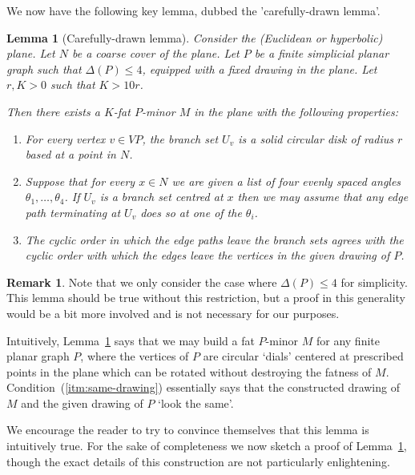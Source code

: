 \documentclass[10pt,a4paper]{amsart}
\newtheorem{lemma}[theorem]{Lemma}
\theoremstyle{definition}
\newtheorem{remark}[theorem]{Remark}
\begin{document}
We now have the following key lemma, dubbed the 'carefully-drawn lemma'. 

\begin{lemma}[Carefully-drawn lemma]\label{lem:dial}
     Consider the (Euclidean or hyperbolic) plane. Let $N$ be a coarse cover of the plane. Let $P$ be a finite simplicial planar graph such that $\Delta(P) \leq 4$, equipped with a fixed drawing in the plane. Let $r, K > 0$ such that $K > 10r$. 
     
     Then there exists a $K$-fat $P$-minor $M$ in the plane with the following properties:
     \begin{enumerate}

         \item\label{itm:disc-branchsets} For every vertex $v \in VP$, the branch set $U_v$ is a solid circular disk of radius $r$ based at a point in $N$. 

		\item Suppose that for every $x \in N$ we are given a list of four evenly spaced angles $\theta_1, \ldots, \theta_4$. If $U_v$ is a branch set centred at $x$ then we may assume that any edge path terminating at $U_v$ does so at one of the $\theta_i$.  

        \item \label{itm:same-drawing}The cyclic order in which the edge paths leave the branch sets agrees with the cyclic  order with which the edges leave the vertices in the given drawing of $P$. 
     \end{enumerate}
\end{lemma}

\begin{remark}
	Note that we only consider the case where $\Delta(P) \leq 4$ for simplicity. This lemma should be true without this restriction, but a proof in this generality would be a bit more involved and is not necessary for our purposes. 
\end{remark}

Intuitively, Lemma~\ref{lem:dial} says that we may build a fat $P$-minor $M$ for any finite planar graph $P$, where the vertices of $P$ are circular `dials' centered at prescribed points in the plane which can be rotated without destroying the fatness of $M$. 
Condition~(\ref{itm:same-drawing}) essentially says that the constructed drawing of $M$ and the given drawing of $P$ `look the same'. 

 
We encourage the reader to try to convince themselves that this lemma is intuitively true. For the sake of completeness we now sketch a proof of Lemma~\ref{lem:dial}, though the exact details of this construction are not particularly enlightening. 
\end{document}
